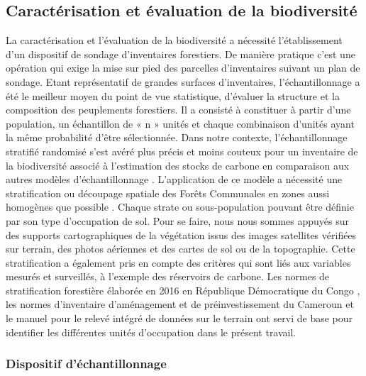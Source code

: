 \documentclass[
  12pt,
  a4paper,
  extrafontsizes,
  onecolumn,
  openright]{book}
\theoremstyle{definition}
\theoremstyle{definition}
\theoremstyle{definition}
\theoremstyle{definition}
\theoremstyle{remark}
\begin{document}
\hypertarget{caractuxe9risation-et-uxe9valuation-de-la-biodiversituxe9}{%
\subsection{Caractérisation et évaluation de la biodiversité}\label{caractuxe9risation-et-uxe9valuation-de-la-biodiversituxe9}}

La caractérisation et l'évaluation de la biodiversité a nécessité l'établissement d'un dispositif de sondage d'inventaires forestiers. De manière pratique c'est une opération qui exige la mise sur pied des parcelles d'inventaires suivant un plan de sondage. Etant représentatif de grandes surfaces d'inventaires, l'échantillonnage a été le meilleur moyen du point de vue statistique, d'évaluer la structure et la composition des peuplements forestiers. Il a consisté à constituer à partir d'une population, un échantillon de « n » unités et chaque combinaison d'unités ayant la même probabilité d'être sélectionnée. Dans notre contexte, l'échantillonnage stratifié randomisé s'est avéré plus précis et moins couteux pour un inventaire de la biodiversité associé à l'estimation des stocks de carbone en comparaison aux autres modèles d'échantillonnage \citep{Anonyme2009d, MacDicken1997}. L'application de ce modèle a nécessité une stratification ou découpage spatiale des Forêts Communales en zones aussi homogènes que possible \citep{Picard_Gourlet-Fleury2008}. Chaque strate ou sous-population pouvant être définie par son type d'occupation de sol. Pour se faire, nous nous sommes appuyés sur des supports cartographiques de la végétation issus des images satellites vérifiées sur terrain, des photos aériennes et des cartes de sol ou de la topographie. Cette stratification a également pris en compte des critères qui sont liés aux variables mesurés et surveillés, à l'exemple des réservoirs de carbone. Les normes de stratification forestière élaborée en 2016 en République Démocratique du Congo \citep{DIAF2016}, les normes d'inventaire d'aménagement et de préinvestissement du Cameroun \citep{ONADEF1991} et le manuel pour le relevé intégré de données sur le terrain \citep{FAO2009} ont servi de base pour identifier les différentes unités d'occupation dans le présent travail.

\hypertarget{dispositif-duxe9chantillonnage}{%
\subsubsection{Dispositif d'échantillonnage}\label{dispositif-duxe9chantillonnage}}
\end{document}
